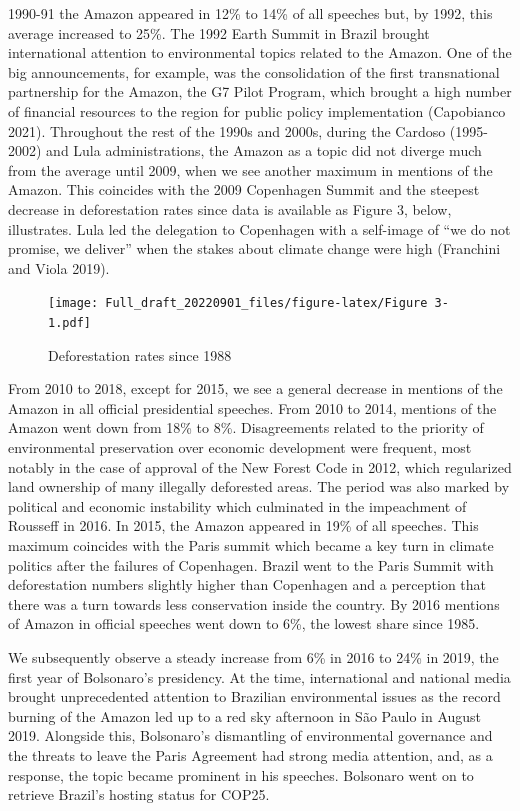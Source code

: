 \documentclass[
  12pt,
]{article}
\begin{document}
1990-91 the Amazon appeared in 12\% to 14\% of all speeches but, by
1992, this average increased to 25\%. The 1992 Earth Summit in Brazil
brought international attention to environmental topics related to the
Amazon. One of the big announcements, for example, was the consolidation
of the first transnational partnership for the Amazon, the G7 Pilot
Program, which brought a high number of financial resources to the
region for public policy implementation (Capobianco 2021). Throughout
the rest of the 1990s and 2000s, during the Cardoso (1995-2002) and Lula
administrations, the Amazon as a topic did not diverge much from the
average until 2009, when we see another maximum in mentions of the
Amazon. This coincides with the 2009 Copenhagen Summit and the steepest
decrease in deforestation rates since data is available as Figure 3,
below, illustrates. Lula led the delegation to Copenhagen with a
self-image of ``we do not promise, we deliver'' when the stakes about
climate change were high (Franchini and Viola 2019).

\begin{figure}
\centering
\texttt{[image: Full\_draft\_20220901\_files/figure-latex/Figure 3-1.pdf]}
\caption{Deforestation rates since 1988}
\end{figure}

From 2010 to 2018, except for 2015, we see a general decrease in
mentions of the Amazon in all official presidential speeches. From 2010
to 2014, mentions of the Amazon went down from 18\% to 8\%.
Disagreements related to the priority of environmental preservation over
economic development were frequent, most notably in the case of approval
of the New Forest Code in 2012, which regularized land ownership of many
illegally deforested areas. The period was also marked by political and
economic instability which culminated in the impeachment of Rousseff in
2016. In 2015, the Amazon appeared in 19\% of all speeches. This maximum
coincides with the Paris summit which became a key turn in climate
politics after the failures of Copenhagen. Brazil went to the Paris
Summit with deforestation numbers slightly higher than Copenhagen and a
perception that there was a turn towards less conservation inside the
country. By 2016 mentions of Amazon in official speeches went down to
6\%, the lowest share since 1985.

We subsequently observe a steady increase from 6\% in 2016 to 24\% in
2019, the first year of Bolsonaro's presidency. At the time,
international and national media brought unprecedented attention to
Brazilian environmental issues as the record burning of the Amazon led
up to a red sky afternoon in São Paulo in August 2019. Alongside this,
Bolsonaro's dismantling of environmental governance and the threats to
leave the Paris Agreement had strong media attention, and, as a
response, the topic became prominent in his speeches. Bolsonaro went on
to retrieve Brazil's hosting status for COP25.
\end{document}

